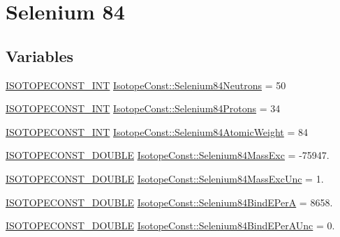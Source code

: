 \hypertarget{group___isotope_const-_selenium-_se84}{}\section{Selenium 84}
\label{group___isotope_const-_selenium-_se84}
\subsection*{Variables}
\begin{DoxyCompactItemize}
\item 
\mbox{\hyperlink{group___isotope_const-_macros_ga5f18360b3e99483a35c32d789e62621c}{I\+S\+O\+T\+O\+P\+E\+C\+O\+N\+S\+T\+\_\+\+I\+NT}} \mbox{\hyperlink{group___isotope_const-_selenium-_se84_gac8d5d7840604f84d03f23a85380894d3}{Isotope\+Const\+::\+Selenium84\+Neutrons}} = 50
\item 
\mbox{\hyperlink{group___isotope_const-_macros_ga5f18360b3e99483a35c32d789e62621c}{I\+S\+O\+T\+O\+P\+E\+C\+O\+N\+S\+T\+\_\+\+I\+NT}} \mbox{\hyperlink{group___isotope_const-_selenium-_se84_gab68c1cc8016755fdb5bdc5b07dace4f9}{Isotope\+Const\+::\+Selenium84\+Protons}} = 34
\item 
\mbox{\hyperlink{group___isotope_const-_macros_ga5f18360b3e99483a35c32d789e62621c}{I\+S\+O\+T\+O\+P\+E\+C\+O\+N\+S\+T\+\_\+\+I\+NT}} \mbox{\hyperlink{group___isotope_const-_selenium-_se84_ga9cf2019579b5f0737d99c5fc2a1e8d9e}{Isotope\+Const\+::\+Selenium84\+Atomic\+Weight}} = 84
\item 
\mbox{\hyperlink{group___isotope_const-_macros_ga8f45a7272ce02c0b4c65c44636ed719a}{I\+S\+O\+T\+O\+P\+E\+C\+O\+N\+S\+T\+\_\+\+D\+O\+U\+B\+LE}} \mbox{\hyperlink{group___isotope_const-_selenium-_se84_ga6a1067c7b6232295df431c562cc098d0}{Isotope\+Const\+::\+Selenium84\+Mass\+Exc}} = -\/75947.
\item 
\mbox{\hyperlink{group___isotope_const-_macros_ga8f45a7272ce02c0b4c65c44636ed719a}{I\+S\+O\+T\+O\+P\+E\+C\+O\+N\+S\+T\+\_\+\+D\+O\+U\+B\+LE}} \mbox{\hyperlink{group___isotope_const-_selenium-_se84_gae99cdc37e686d033953c76c8376b56d9}{Isotope\+Const\+::\+Selenium84\+Mass\+Exc\+Unc}} = 1.
\item 
\mbox{\hyperlink{group___isotope_const-_macros_ga8f45a7272ce02c0b4c65c44636ed719a}{I\+S\+O\+T\+O\+P\+E\+C\+O\+N\+S\+T\+\_\+\+D\+O\+U\+B\+LE}} \mbox{\hyperlink{group___isotope_const-_selenium-_se84_gae68f53695628b992bb6c9fba426c2758}{Isotope\+Const\+::\+Selenium84\+Bind\+E\+PerA}} = 8658.
\item 
\mbox{\hyperlink{group___isotope_const-_macros_ga8f45a7272ce02c0b4c65c44636ed719a}{I\+S\+O\+T\+O\+P\+E\+C\+O\+N\+S\+T\+\_\+\+D\+O\+U\+B\+LE}} \mbox{\hyperlink{group___isotope_const-_selenium-_se84_gad83db7ca14818ae85a69591525d22a21}{Isotope\+Const\+::\+Selenium84\+Bind\+E\+Per\+A\+Unc}} = 0.

\end{DoxyCompactItemize}
